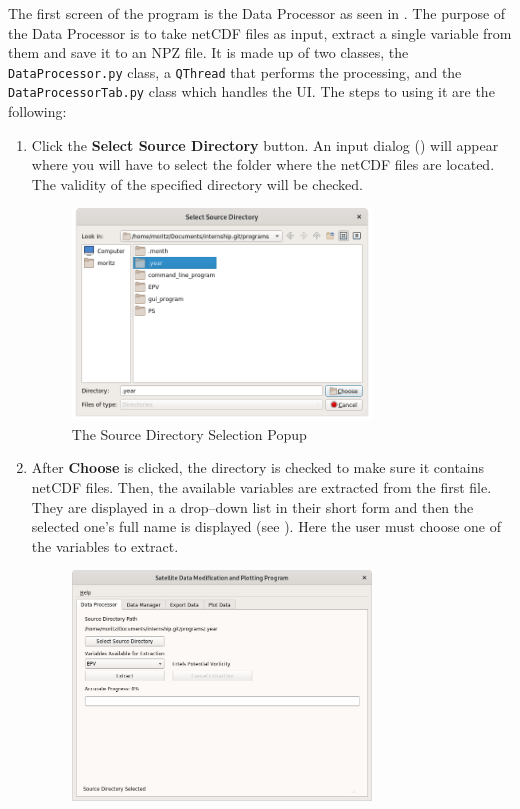 \documentclass[../00_main.tex]{subfiles}
\begin{document}
The first screen of the program is the Data Processor as seen in .
The purpose of the Data Processor is to take netCDF files as input, extract
a single variable from them and save it to an NPZ file. It is made up of two
classes, the \texttt{DataProcessor.py} class, a \texttt{QThread} that performs the
processing, and the \texttt{DataProcessorTab.py} class which handles the UI. 
The steps to using it are the following:
\begin{enumerate}
    \item Click the \textbf{Select Source Directory} button. An input dialog
        ()
        will appear where you will have to select the folder where the netCDF
        files are located. The validity of the specified directory will be
        checked. 
            \begin{figure}[H]
                \center
                \includegraphics[width=0.75\textwidth]{../graphics/dp02}
                \caption{The Source Directory Selection Popup}
                \label{dp02}
            \end{figure}
    \item After \textbf{Choose} is clicked, the directory is checked to
        make sure it contains netCDF files. Then, the available
        variables are extracted from the first file. They are displayed in
        a drop--down list in their short form and then the selected one's
        full name is displayed (see ). Here the user must 
        choose one of the variables to extract. 
        \begin{figure}[H]
            \center
            \includegraphics[width=0.75\textwidth]{../graphics/dp03}

\end{figure}
\end{enumerate}
\end{document}

